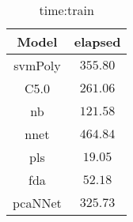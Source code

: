 \begin{table}[!ht]
	\centering
	\begin{tabular}{|c|c|}
		\hline
		Model & elapsed \\ \hline
		svmPoly & $355.80$ \\ \hline
		C5.0 & $261.06$ \\ \hline
		nb & $121.58$ \\ \hline
		nnet & $464.84$ \\ \hline
		pls & $19.05$ \\ \hline
		fda & $52.18$ \\ \hline
		pcaNNet & $325.73$ \\ \hline
	\end{tabular}
	\caption{time:train}
	\label{tab:time:train}
\end{table}
